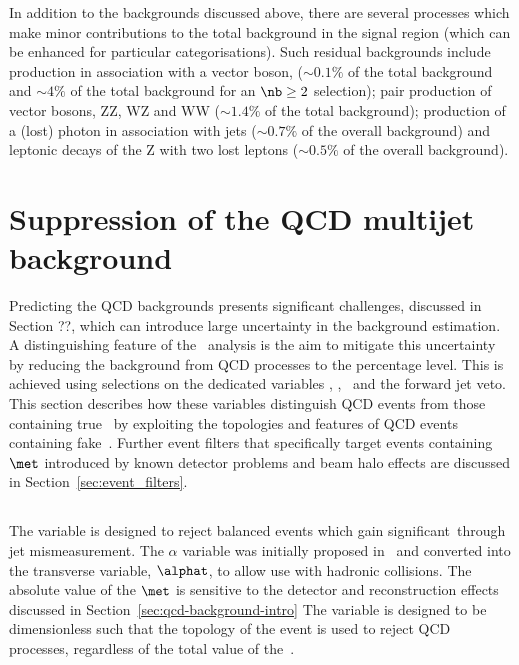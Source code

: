 In addition to the backgrounds discussed above, there are several processes which 
make minor contributions to the total background in the signal region (which can be enhanced
for particular categorisations). Such residual backgrounds include \ttbar production in association with a vector
boson, ($\sim0.1\%$ of the total background and $\sim4\%$ of the total background for an $\nb \ge 2$ selection); 
pair production of vector bosons, ZZ, WZ and WW ($\sim1.4\%$ of the total background); 
production of a (lost) photon in association with jets ($\sim0.7\%$ of the overall background) and
leptonic decays of the Z with two lost leptons ($\sim0.5\%$ of the overall background).

\section{Suppression of the QCD multijet background}
\label{sec:important-variables}

Predicting the QCD backgrounds presents significant challenges, discussed in Section ??, which
can introduce large uncertainty in the background estimation. A distinguishing feature
of the \alphat~analysis is the aim to mitigate this uncertainty by reducing the 
background from QCD processes to the percentage level. This is achieved using selections on
the dedicated variables \alphat, \bdphi, \mhtmet~and the forward jet veto. This section
describes how these variables distinguish QCD events from those containing true~\met
by exploiting the topologies and features of QCD events containing fake~\met. Further
event filters that specifically target events containing $\met$ introduced by
known detector problems and beam halo effects are discussed in Section~\ref{sec:event_filters}.

\subsection{\alphat}
The \alphat variable is designed to reject balanced events which gain significant~\met through
jet mismeasurement. The $\alpha$ variable was initially proposed in~\cite{Randall} and
converted into the transverse variable, $\alphat$, to allow use with hadronic collisions. The absolute
value of the $\met$ is sensitive to the detector and reconstruction effects discussed in Section~\ref{sec:qcd-background-intro} 
The \alphat variable is designed to be dimensionless such that the topology of the event is used to reject 
QCD processes, regardless of the total value of the~\met.

